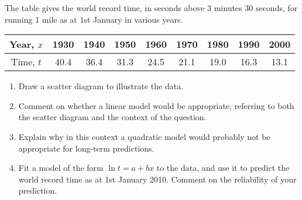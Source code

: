 \begin{problem}
    The table gives the world record time, in seconds above 3 minutes 30 seconds, for running 1 mile as at $1$st January in various years.

    \begin{table}[H]
        \centering
        \begin{tabular}{|c|c|c|c|c|c|c|c|c|} \hline
            Year, $x$ & 1930 & 1940 & 1950 & 1960 & 1970 & 1980 & 1990 & 2000 \\ \hline
            Time, $t$ & 40.4 & 36.4 & 31.3 & 24.5 & 21.1 & 19.0 & 16.3 & 13.1 \\ \hline
        \end{tabular}
    \end{table}

    \begin{enumerate}
        \item Draw a scatter diagram to illustrate the data.
        \item Comment on whether a linear model would be appropriate, referring to both the scatter diagram and the context of the question.
        \item Explain why in this context a quadratic model would probably not be appropriate for long-term predictions.
        \item Fit a model of the form $\ln t = a + b x$ to the data, and use it to predict the world record time as at 1st January 2010. Comment on the reliability of your prediction.
    \end{enumerate}
\end{problem}
